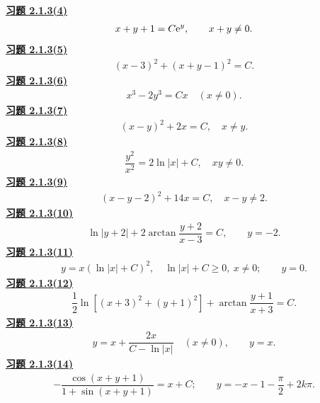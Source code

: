 \noindent\textbf{\hyperref[q:2.1.3(4)]{习题 2.1.3(4)}}
\[\begin{gathered}x+y+1=C\mathrm e^y,\qquad x+y\ne0.\end{gathered}\]
\noindent\textbf{\hyperref[q:2.1.3(5)]{习题 2.1.3(5)}}
\[\begin{gathered}(x-3)^2+(x+y-1)^2=C.\end{gathered}\]
\noindent\textbf{\hyperref[q:2.1.3(6)]{习题 2.1.3(6)}}
\[\begin{gathered}x^3-2y^3=Cx\quad(x\ne0).\end{gathered}\]
\noindent\textbf{\hyperref[q:2.1.3(7)]{习题 2.1.3(7)}}
\[\begin{gathered}(x-y)^2+2x=C,\quad x\ne y.\end{gathered}\]
\noindent\textbf{\hyperref[q:2.1.3(8)]{习题 2.1.3(8)}}
\[\begin{gathered}\dfrac{y^2}{x^2}=2\ln|x|+C,\quad xy\ne0.\end{gathered}\]
\noindent\textbf{\hyperref[q:2.1.3(9)]{习题 2.1.3(9)}}
\[\begin{gathered}(x-y-2)^2+14x=C,\quad x-y\ne2.\end{gathered}\]
\noindent\textbf{\hyperref[q:2.1.3(10)]{习题 2.1.3(10)}}
\[\begin{gathered}\ln|y+2|+2\arctan\dfrac{y+2}{x-3}=C,\qquad y=-2.\end{gathered}\]
\noindent\textbf{\hyperref[q:2.1.3(11)]{习题 2.1.3(11)}}
\[\begin{gathered}y=x(\ln|x|+C)^2,\quad \ln|x|+C\ge0,\ x\ne0;\qquad y=0.\end{gathered}\]
\noindent\textbf{\hyperref[q:2.1.3(12)]{习题 2.1.3(12)}}
\[\begin{gathered}\dfrac12\ln[(x+3)^2+(y+1)^2]+\arctan\dfrac{y+1}{x+3}=C.\end{gathered}\]
\noindent\textbf{\hyperref[q:2.1.3(13)]{习题 2.1.3(13)}}
\[\begin{gathered}y=x+\dfrac{2x}{C-\ln|x|}\quad(x\ne0),\qquad y=x.\end{gathered}\]
\noindent\textbf{\hyperref[q:2.1.3(14)]{习题 2.1.3(14)}}
\[\begin{gathered}-\dfrac{\cos(x+y+1)}{1+\sin(x+y+1)}=x+C;\qquad
 y=-x-1-\dfrac\pi2+2k\pi.\end{gathered}\]
